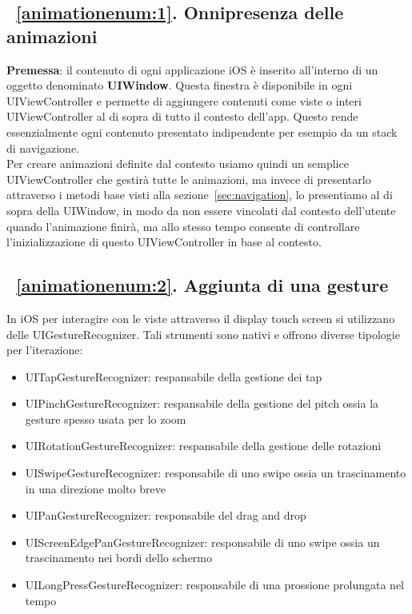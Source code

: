 \subsection{~\ref{animationenum:1}. Onnipresenza delle animazioni}

\textbf{Premessa}: il contenuto di ogni applicazione iOS è inserito all'interno di un oggetto denominato
\textbf{UIWindow}\cite{uiwindow}. Questa finestra è disponibile in ogni UIViewController e permette di aggiungere contenuti
come viste o interi UIViewController al di sopra di tutto il contesto dell'app. Questo rende essenzialmente ogni contenuto presentato
indipendente per esempio da un stack di navigazione.\\ 

Per creare animazioni definite dal contesto usiamo quindi un semplice UIViewController che gestirà tutte le animazioni,
ma invece di presentarlo attraverso i metodi base visti alla sezione~\ref{sec:navigation}, lo presentiamo al di sopra della UIWindow,
in modo da non essere vincolati dal contesto dell'utente quando l'animazione finirà, ma allo stesso tempo
consente di controllare l'inizializzazione di questo UIViewController in base al contesto.

\subsection{~\ref{animationenum:2}. Aggiunta di una gesture}

In iOS per interagire con le viste attraverso il display touch screen si utilizzano delle UIGestureRecognizer.
Tali strumenti sono nativi e offrono diverse tipologie per l'iterazione:
\begin{itemize}
    \item UITapGestureRecognizer: respansabile della gestione dei tap

    \item UIPinchGestureRecognizer: respansabile della gestione del pitch ossia la gesture spesso usata per lo zoom
    
    \item UIRotationGestureRecognizer: respansabile della gestione delle rotazioni
    
    \item UISwipeGestureRecognizer: responsabile di uno swipe ossia un trascinamento in una direzione molto breve
    
    \item UIPanGestureRecognizer: responsabile del drag and drop
    
    \item UIScreenEdgePanGestureRecognizer: responsabile di uno swipe ossia un trascinamento nei bordi dello schermo
    
    \item UILongPressGestureRecognizer: responsabile di una prossione prolungata nel tempo
\end{itemize}

